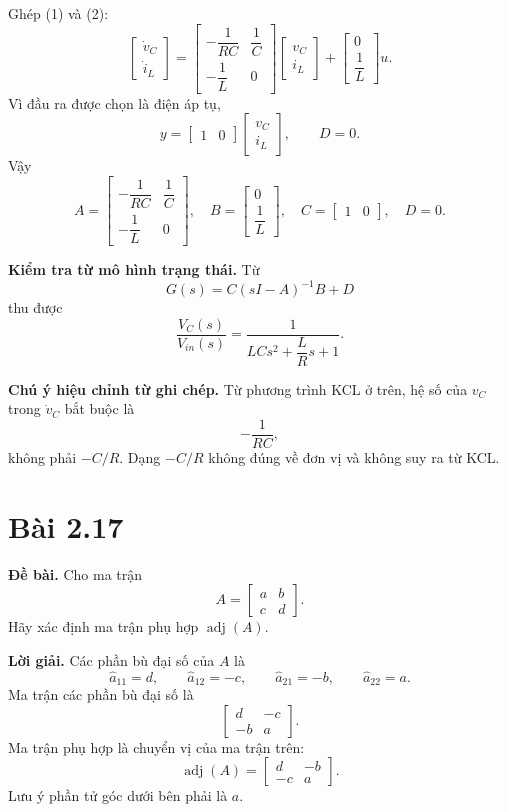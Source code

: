 \documentclass[11pt,a4paper]{article}
\newcommand{\baitap}[1]{%
  \Needspace{4\baselineskip}%
  \section*{Bài #1}%
}
\newcommand{\debai}{\par\noindent\textbf{Đề bài.}\enspace}
\newcommand{\loigiai}{\par\smallskip\noindent\textbf{Lời giải.}\enspace}
\begin{document}
Ghép (1) và (2):
\[
\boxed{
\begin{bmatrix}
\dot v_C\\[2mm]
\dot i_L
\end{bmatrix}
=
\begin{bmatrix}
-\dfrac{1}{RC}&\dfrac1C\\[2mm]
-\dfrac1L&0
\end{bmatrix}
\begin{bmatrix}
v_C\\[2mm]
i_L
\end{bmatrix}
+
\begin{bmatrix}
0\\[2mm]
\dfrac1L
\end{bmatrix}u.
}
\]
Vì đầu ra được chọn là điện áp tụ,
\[
\boxed{
y=
\begin{bmatrix}
1&0
\end{bmatrix}
\begin{bmatrix}
v_C\\ i_L
\end{bmatrix},\qquad D=0.
}
\]
Vậy
\[
\boxed{
A=
\begin{bmatrix}
-\dfrac{1}{RC}&\dfrac1C\\[2mm]
-\dfrac1L&0
\end{bmatrix},\quad
B=
\begin{bmatrix}
0\\[2mm]
\dfrac1L
\end{bmatrix},\quad
C=
\begin{bmatrix}
1&0
\end{bmatrix},\quad D=0.
}
\]

\textbf{Kiểm tra từ mô hình trạng thái.}
Từ
\[
G(s)=C(sI-A)^{-1}B+D
\]
thu được
\[
\boxed{
\frac{V_C(s)}{V_{in}(s)}
=
\frac{1}{LCs^2+\dfrac{L}{R}s+1}.
}
\]

\textbf{Chú ý hiệu chỉnh từ ghi chép.}
Từ phương trình KCL ở trên, hệ số của $v_C$ trong $\dot v_C$ bắt buộc là
\[
-\frac{1}{RC},
\]
không phải $-C/R$. Dạng $-C/R$ không đúng về đơn vị và không suy ra từ KCL.



\baitap{2.17}
\debai
Cho ma trận
\[
A=\begin{bmatrix}a&b\\c&d\end{bmatrix}.
\]
Hãy xác định ma trận phụ hợp \(\operatorname{adj}(A)\).

\loigiai
Các phần bù đại số của \(A\) là
\[
\hat a_{11}=d,\qquad
\hat a_{12}=-c,\qquad
\hat a_{21}=-b,\qquad
\hat a_{22}=a.
\]
Ma trận các phần bù đại số là
\[
\begin{bmatrix}
d&-c\\
-b&a
\end{bmatrix}.
\]
Ma trận phụ hợp là chuyển vị của ma trận trên:
\[
\boxed{
\operatorname{adj}(A)=
\begin{bmatrix}
d&-b\\
-c&a
\end{bmatrix}.}
\]
Lưu ý phần tử góc dưới bên phải là \(a\).
\end{document}
